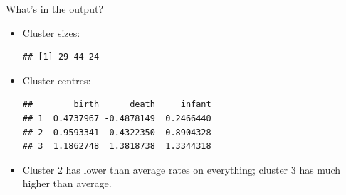 \begin{frame}[fragile]{What's in the output?}
  
  \begin{itemize}
  \item Cluster sizes:
    

\begin{knitrout}
\color{fgcolor}\begin{kframe}
\begin{alltt}
\hlopt{$}
\end{alltt}
\begin{verbatim}
## [1] 29 44 24
\end{verbatim}
\end{kframe}
\end{knitrout}

\item Cluster centres:
  
\begin{knitrout}
\color{fgcolor}\begin{kframe}
\begin{alltt}
\hlopt{$}
\end{alltt}
\begin{verbatim}
##        birth      death     infant
## 1  0.4737967 -0.4878149  0.2466440
## 2 -0.9593341 -0.4322350 -0.8904328
## 3  1.1862748  1.3818738  1.3344318
\end{verbatim}
\end{kframe}
\end{knitrout}

\item Cluster 2 has lower than average rates on everything; cluster 3
  has much higher than average.
    
  \end{itemize}
  
\end{frame}

